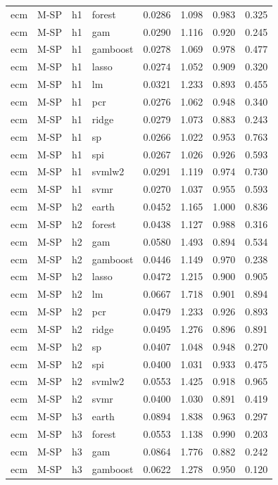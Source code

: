 \begin{ThreePartTable}
\begin{longtable}[t]{llclcccc}
ecm & M-SP & h1 & forest & 0.0286 & 1.098 & 0.983 & 0.325\\
ecm & M-SP & h1 & gam & 0.0290 & 1.116 & 0.920 & 0.245\\
ecm & M-SP & h1 & gamboost & 0.0278 & 1.069 & 0.978 & 0.477\\
ecm & M-SP & h1 & lasso & 0.0274 & 1.052 & 0.909 & 0.320\\
ecm & M-SP & h1 & lm & 0.0321 & 1.233 & 0.893 & 0.455\\
ecm & M-SP & h1 & pcr & 0.0276 & 1.062 & 0.948 & 0.340\\
ecm & M-SP & h1 & ridge & 0.0279 & 1.073 & 0.883 & 0.243\\
ecm & M-SP & h1 & sp & 0.0266 & 1.022 & 0.953 & 0.763\\
ecm & M-SP & h1 & spi & 0.0267 & 1.026 & 0.926 & 0.593\\
ecm & M-SP & h1 & svmlw2 & 0.0291 & 1.119 & 0.974 & 0.730\\
ecm & M-SP & h1 & svmr & 0.0270 & 1.037 & 0.955 & 0.593\\
\addlinespace
ecm & M-SP & h2 & earth & 0.0452 & 1.165 & 1.000 & 0.836\\
ecm & M-SP & h2 & forest & 0.0438 & 1.127 & 0.988 & 0.316\\
ecm & M-SP & h2 & gam & 0.0580 & 1.493 & 0.894 & 0.534\\
ecm & M-SP & h2 & gamboost & 0.0446 & 1.149 & 0.970 & 0.238\\
ecm & M-SP & h2 & lasso & 0.0472 & 1.215 & 0.900 & 0.905\\
ecm & M-SP & h2 & lm & 0.0667 & 1.718 & 0.901 & 0.894\\
ecm & M-SP & h2 & pcr & 0.0479 & 1.233 & 0.926 & 0.893\\
ecm & M-SP & h2 & ridge & 0.0495 & 1.276 & 0.896 & 0.891\\
ecm & M-SP & h2 & sp & 0.0407 & 1.048 & 0.948 & 0.270\\
ecm & M-SP & h2 & spi & 0.0400 & 1.031 & 0.933 & 0.475\\
ecm & M-SP & h2 & svmlw2 & 0.0553 & 1.425 & 0.918 & 0.965\\
ecm & M-SP & h2 & svmr & 0.0400 & 1.030 & 0.891 & 0.419\\
\addlinespace
ecm & M-SP & h3 & earth & 0.0894 & 1.838 & 0.963 & 0.297\\
ecm & M-SP & h3 & forest & 0.0553 & 1.138 & 0.990 & 0.203\\
ecm & M-SP & h3 & gam & 0.0864 & 1.776 & 0.882 & 0.242\\
ecm & M-SP & h3 & gamboost & 0.0622 & 1.278 & 0.950 & 0.120\\

\end{longtable}
\end{ThreePartTable}
